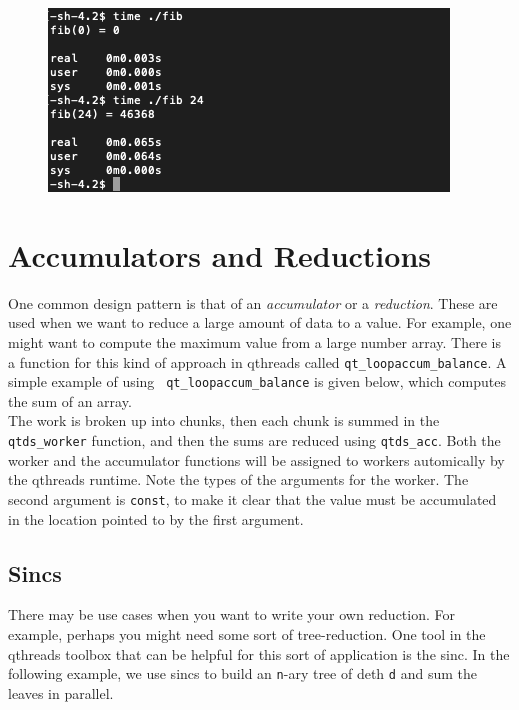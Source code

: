 \documentclass[12pt,fullpage]{article}
\begin{document}
\begin{figure}
\includegraphics{images/fib_preconditioned.png}
\end{figure}


\section{Accumulators and Reductions}
One common design pattern is that of an \emph{accumulator} or a
\emph{reduction}. These are used when we want to reduce a large amount of data
to a value. For example, one might want to compute the maximum value from a
large number array. There is a function for this kind of approach in qthreads
called {\tt qt\_loopaccum\_balance}. A simple example of using {\tt
qt\_loopaccum\_balance} is given below, which computes the sum of an array.
\\



The work is broken up into chunks, then each chunk is summed in the {\tt
qtds\_worker} function, and then the sums are reduced using {\tt qtds\_acc}.
Both the worker and the accumulator functions will be assigned to workers
automically by the qthreads runtime. Note the types of the arguments for the
worker. The second argument is {\tt const}, to make it clear that the value must
be accumulated in the location pointed to by the first argument. 

\subsection{Sincs}
There may be use cases when you want to write your own reduction. For example,
perhaps you might need some sort of tree-reduction. One tool in the qthreads
toolbox that can be helpful for this sort of application is the sinc. In the
following example, we use sincs to build an {\tt n}-ary tree of deth {\tt d}
and sum the leaves in parallel.
\\


\end{document}
